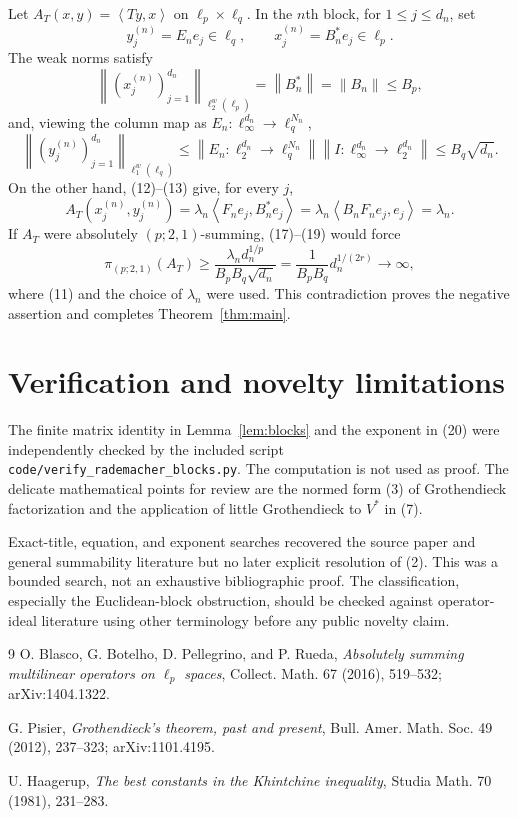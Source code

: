 \documentclass[11pt]{article}
\newcommand{\norm}[1]{\left\lVert #1\right\rVert}
\newcommand{\ip}[2]{\left\langle #1,#2\right\rangle}
\begin{document}
Let $A_T(x,y)=\ip{Ty}{x}$ on $\ell_p\times\ell_q$.  In the $n$th block, for
$1\le j\le d_n$, set
\[
 y_j^{(n)}=E_ne_j\in\ell_q,
 \qquad x_j^{(n)}=B_n^*e_j\in\ell_p.                                  \tag{16}
\]
The weak norms satisfy
\[
 \norm{(x_j^{(n)})_{j=1}^{d_n}}_{\ell_2^w(\ell_p)}
 =\norm{B_n^*}=\norm{B_n}\le B_p,                                     \tag{17}
\]
and, viewing the column map as $E_n:\ell_\infty^{d_n}\to\ell_q^{N_n}$,
\[
 \norm{(y_j^{(n)})_{j=1}^{d_n}}_{\ell_1^w(\ell_q)}
 \le\norm{E_n:\ell_2^{d_n}\to\ell_q^{N_n}}
       \norm{I:\ell_\infty^{d_n}\to\ell_2^{d_n}}
 \le B_q\sqrt{d_n}.                                                    \tag{18}
\]
On the other hand, (12)--(13) give, for every $j$,
\[
 A_T(x_j^{(n)},y_j^{(n)})
 =\lambda_n\ip{F_ne_j}{B_n^*e_j}
 =\lambda_n\ip{B_nF_ne_j}{e_j}
 =\lambda_n.                                                           \tag{19}
\]
If $A_T$ were absolutely $(p;2,1)$-summing, (17)--(19) would force
\[
 \pi_{(p;2,1)}(A_T)
 \ge\frac{\lambda_nd_n^{1/p}}{B_pB_q\sqrt{d_n}}
 =\frac1{B_pB_q}d_n^{1/(2r)}\longrightarrow\infty,                    \tag{20}
\]
where (11) and the choice of $\lambda_n$ were used.  This contradiction
proves the negative assertion and completes Theorem~\ref{thm:main}.

\section{Verification and novelty limitations}

The finite matrix identity in Lemma~\ref{lem:blocks} and the exponent in
(20) were independently checked by the included script
\texttt{code/verify\_rademacher\_blocks.py}.  The computation is not used as
proof.  The delicate mathematical points for review are the normed form (3)
of Grothendieck factorization and the application of little Grothendieck to
$V^*$ in (7).

Exact-title, equation, and exponent searches recovered the source paper and
general summability literature but no later explicit resolution of (2).  This
was a bounded search, not an exhaustive bibliographic proof.  The
classification, especially the Euclidean-block obstruction, should be checked
against operator-ideal literature using other terminology before any public
novelty claim.

\begin{thebibliography}{9}
O. Blasco, G. Botelho, D. Pellegrino, and P. Rueda,
\emph{Absolutely summing multilinear operators on $\ell_p$ spaces},
Collect. Math. 67 (2016), 519--532; arXiv:1404.1322.

G. Pisier,
\emph{Grothendieck's theorem, past and present},
Bull. Amer. Math. Soc. 49 (2012), 237--323; arXiv:1101.4195.

U. Haagerup,
\emph{The best constants in the Khintchine inequality},
Studia Math. 70 (1981), 231--283.
\end{thebibliography}
\end{document}
